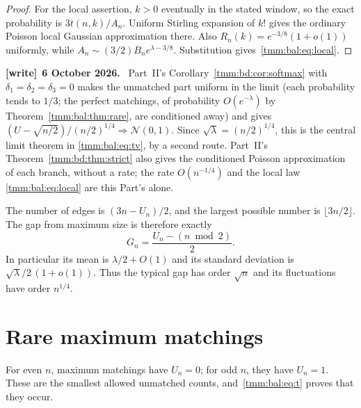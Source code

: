 \documentclass[11pt,letterpaper]{article}
\theoremstyle{remark}\newtheorem{remark}[theorem]{Remark}
\newcommand{\Normal}{\mathcal N}
\newenvironment{writenote}[1][]{\par\smallskip\begingroup\small
 \noindent\textbf{[write]}\if\relax\detokenize{#1}\relax\else~\textbf{#1.}\fi\ }%
 {\par\endgroup\smallskip}
\begin{document}
\begin{proof}
For the local assertion, $k>0$ eventually in the stated window, so the exact probability is $3t(n,k)/A_n$. Uniform Stirling expansion of $k!$ gives the ordinary Poisson local Gaussian approximation there. Also $R_n(k)=e^{-3/8}(1+o(1))$ uniformly, while $A_n\sim(3/2)B_ne^{\lambda-3/8}$. Substitution gives~\eqref{tmm:bal:eq:local}.
\end{proof}
\begin{writenote}[6 October 2026]
Part~II's Corollary~\ref{tmm:bd:cor:softmax} with $\delta_1=\delta_2=\delta_3=0$ makes the unmatched part uniform in the limit (each probability tends to $1/3$; the perfect matchings, of probability $O(e^{-\lambda})$ by Theorem~\ref{tmm:bal:thm:rare}, are conditioned away) and gives $(U-\sqrt{n/2})/(n/2)^{1/4}\Rightarrow\Normal(0,1)$. Since $\sqrt\lambda=(n/2)^{1/4}$, this is the central limit theorem in \eqref{tmm:bal:eq:tv}, by a second route. Part~II's Theorem~\ref{tmm:bd:thm:strict} also gives the conditioned Poisson approximation of each branch, without a rate; the rate $O(n^{-1/4})$ and the local law \eqref{tmm:bal:eq:local} are this Part's alone.
\end{writenote}

The number of edges is $(3n-U_n)/2$, and the largest possible number is $\lfloor3n/2\rfloor$. The gap from maximum size is therefore exactly
\begin{equation}\label{tmm:bal:eq:gap}
 G_n=\frac{U_n-(n\bmod2)}2.
\end{equation}
In particular its mean is $\lambda/2+O(1)$ and its standard deviation is $\sqrt\lambda/2\,(1+o(1))$. Thus the typical gap has order $\sqrt n$ and its fluctuations have order $n^{1/4}$.

\section{Rare maximum matchings}\label{tmm:bal:sec:rare}
For even $n$, maximum matchings have $U_n=0$; for odd $n$, they have $U_n=1$. These are the smallest allowed unmatched counts, and~\eqref{tmm:bal:eq:t} proves that they occur.
\end{document}
